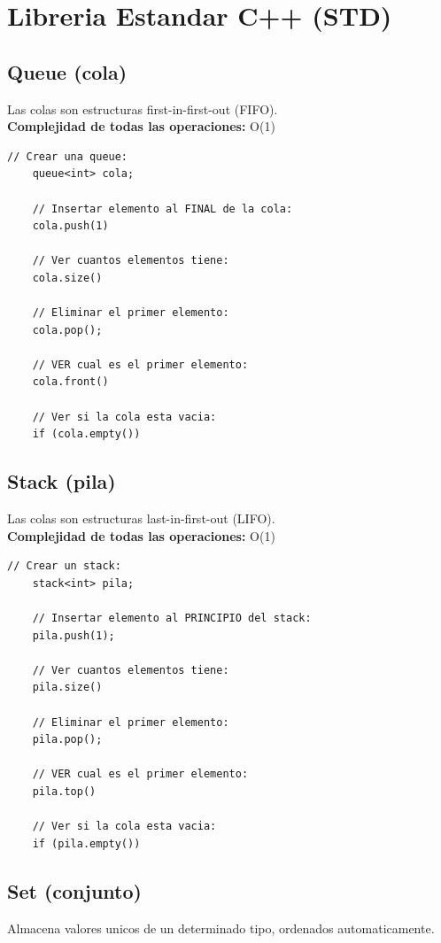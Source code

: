 \chapter{Libreria Estandar C++ (STD)}

\section{Queue (cola)}
Las colas son estructuras first-in-first-out (FIFO). \\
\textbf{Complejidad de todas las operaciones:} O(1)

\begin{lstlisting}[style=cppstyle, caption={Funcionamiento de la queue}]
	// Crear una queue:
	queue<int> cola;
	
	// Insertar elemento al FINAL de la cola: 
	cola.push(1)
	
	// Ver cuantos elementos tiene: 
	cola.size()
	
	// Eliminar el primer elemento: 
	cola.pop();
	
	// VER cual es el primer elemento: 
	cola.front()
	
	// Ver si la cola esta vacia: 
	if (cola.empty())
\end{lstlisting}

\section{Stack (pila)}
Las colas son estructuras last-in-first-out (LIFO). \\
\textbf{Complejidad de todas las operaciones:} O(1)

\begin{lstlisting}[style=cppstyle, caption={Funcionamiento del stack}]
	// Crear un stack:
	stack<int> pila;
	
	// Insertar elemento al PRINCIPIO del stack: 
	pila.push(1);
	
	// Ver cuantos elementos tiene: 
	pila.size()
	
	// Eliminar el primer elemento: 
	pila.pop();
	
	// VER cual es el primer elemento: 
	pila.top()
	
	// Ver si la cola esta vacia: 
	if (pila.empty())
\end{lstlisting}

\section{Set (conjunto)}
Almacena valores unicos de un determinado tipo, ordenados automaticamente.


